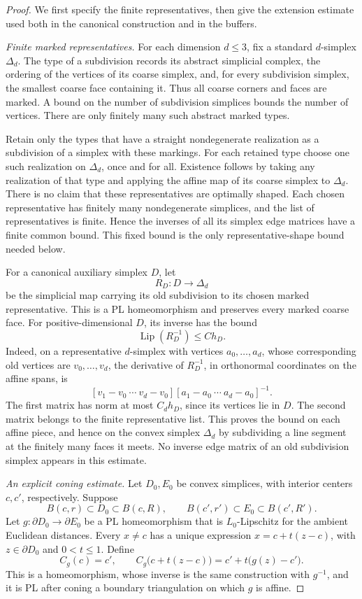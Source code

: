 \documentclass[11pt]{article}
\numberwithin{equation}{section}
\theoremstyle{definition}
\theoremstyle{remark}
\DeclareMathOperator{\Lip}{Lip}
\begin{document}
\begin{proof}
We first specify the finite representatives, then give the extension
estimate used both in the canonical construction and in the buffers.

\emph{Finite marked representatives.}
For each dimension $d\leq 3$, fix a standard $d$-simplex $\Delta_d$.
The type of a subdivision records its abstract simplicial complex,
the ordering of the vertices of its coarse simplex, and, for every
subdivision simplex, the smallest coarse face containing it.
Thus all coarse corners and faces are marked.  A bound on the number
of subdivision simplices bounds the number of vertices.  There are
only finitely many such abstract marked types.

Retain only the types that have a straight nondegenerate realization
as a subdivision of a simplex with these markings.  For each retained
type choose one such realization on $\Delta_d$, once and for all.
Existence follows by taking any realization of that type and applying
the affine map of its coarse simplex to $\Delta_d$.  There is no
claim that these representatives are optimally shaped.  Each chosen
representative has finitely many nondegenerate simplices, and the
list of representatives is finite.  Hence the inverses of all its
simplex edge matrices have a finite common bound.  This fixed bound
is the only representative-shape bound needed below.

For a canonical auxiliary simplex $D$, let
\[
 R_D:D\longrightarrow\Delta_d
\]
be the simplicial map carrying its old subdivision to its chosen
marked representative.  This is a PL homeomorphism and preserves
every marked coarse face.  For positive-dimensional $D$, its inverse has the bound
\[
 \Lip(R_D^{-1})\leq C h_D.
\]
Indeed, on a representative $d$-simplex with vertices
$a_0,\ldots,a_d$, whose corresponding old vertices are
$v_0,\ldots,v_d$, the derivative of $R_D^{-1}$, in orthonormal
coordinates on the affine spans, is
\[
 [v_1-v_0\ \cdots\ v_d-v_0]
 [a_1-a_0\ \cdots\ a_d-a_0]^{-1}.
\]
The first matrix has norm at most $C_d h_D$, since its vertices lie
in $D$.  The second matrix belongs to the finite representative
list.  This proves the bound on each affine piece, and hence on
the convex simplex $\Delta_d$ by subdividing a line segment at the
finitely many faces it meets.  No inverse edge matrix of an old
subdivision simplex appears in this estimate.

\emph{An explicit coning estimate.}
Let $D_0,E_0$ be convex simplices, with interior centers $c,c'$,
respectively.  Suppose
\[
 B(c,r)\subset D_0\subset B(c,R),\qquad
 B(c',r')\subset E_0\subset B(c',R').
\]
Let $g:\partial D_0\to\partial E_0$ be a PL homeomorphism that is
$L_0$-Lipschitz for the ambient Euclidean distances.  Every
$x\ne c$ has a unique expression
$x=c+t(z-c)$, with $z\in\partial D_0$ and $0<t\leq 1$.
Define
\[
 C_g(c)=c',\qquad
 C_g\bigl(c+t(z-c)\bigr)=c'+t\bigl(g(z)-c'\bigr).
\]
This is a homeomorphism, whose inverse is the same construction
with $g^{-1}$, and it is PL after coning a boundary triangulation
on which $g$ is affine.


\end{proof}
\end{document}

